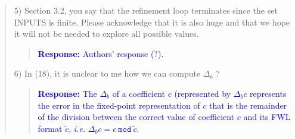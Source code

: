 \documentclass[11pt]{article}
\begin{document}
\begin{quote}
5) Section 3.2, you say that the refinement loop terminates since the set INPUTS is finite. Please acknowledge that it is also huge and that we hope it will not be needed to explore all possible values.
\begin{quote}
\textcolor{blue}{\textbf{Response:} Authors' response (?).}
\end{quote}


6) In (18), it is unclear to me how we can compute  $\Delta_b$ ?
\begin{quote}
\textcolor{blue}{\textbf{Response:} The $\Delta_{b}$ of a coefficient $c$ (represented by $\Delta_{b}c$ represents the error in the fixed-point representation of $c$ that is the remainder of the division between the correct value of coefficient $c$ and its FWL format $\tilde{c}$, {\it i.e.} $\Delta_{b}c=c~ \texttt{mod}~\tilde{c}$.}
\end{quote}


\end{quote}


\newpage
\end{document}
